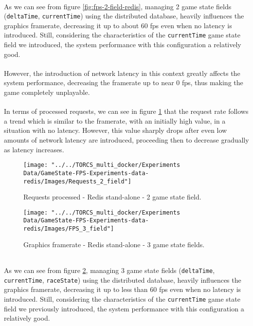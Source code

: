 \\ As we can see from figure \ref{fig:fps-2-field-redis}, managing 2 game state fields (\texttt{deltaTime}, \texttt{currentTime}) using the distributed database, heavily influences the graphics framerate, decreasing it up to about 60 fps even when no latency is introduced. Still, considering the characteristics of the \texttt{currentTime} game state field we introduced, the system performance with this configuration a relatively good. \\ \\
However, the introduction of network latency in this context greatly affects the system performance, decreasing the framerate up to near 0 fps, thus making the game completely unplayable. \\ \\
In terms of processed requests, we can see in figure \ref{fig:requests-2-field-redis} that the request rate follows a trend which is similar to the framerate, with an initially high value, in a situation with no latency. However, this value sharply drops after even low amounts of network latency are introduced, proceeding then to decrease gradually as latency increases. \\
\begin{figure}[h!]
	\centering
	\texttt{[image: "../../TORCS\_multi\_docker/Experiments Data/GameState-FPS-Experiments-data-redis/Images/Requests\_2\_field"]}
	\caption[Requests processed - Redis stand-alone - 2 game state field]{Requests processed - Redis stand-alone - 2 game state field.}
	\label{fig:requests-2-field-redis}
\end{figure}
\begin{figure}[h!]
	\centering
	\texttt{[image: "../../TORCS\_multi\_docker/Experiments Data/GameState-FPS-Experiments-data-redis/Images/FPS\_3\_field"]}
	\caption[Graphics framerate - Redis stand-alone - 3 game state fields]{Graphics framerate - Redis stand-alone - 3 game state fields.}
	\label{fig:fps-3-field-redis}
\end{figure}
\\ As we can see from figure \ref{fig:fps-3-field-redis}, managing 3 game state fields (\texttt{deltaTime}, \texttt{currentTime}, \texttt{raceState}) using the distributed database, heavily influences the graphics framerate, decreasing it up to less than 60 fps even when no latency is introduced. Still, considering the characteristics of the \texttt{currentTime} game state field we previously introduced, the system performance with this configuration a relatively good. \\ \\
